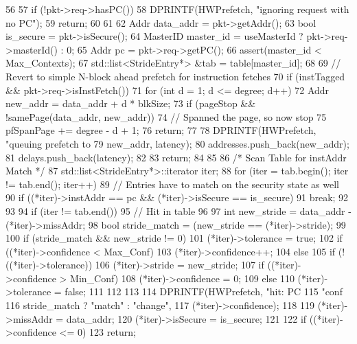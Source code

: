 \begin{DoxyCode}
56 {
57     if (!pkt->req->hasPC()) {
58         DPRINTF(HWPrefetch, "ignoring request with no PC");
59         return;
60     }
61 
62     Addr data_addr = pkt->getAddr();
63     bool is_secure = pkt->isSecure();
64     MasterID master_id = useMasterId ? pkt->req->masterId() : 0;
65     Addr pc = pkt->req->getPC();
66     assert(master_id < Max_Contexts);
67     std::list<StrideEntry*> &tab = table[master_id];
68 
69     // Revert to simple N-block ahead prefetch for instruction fetches
70     if (instTagged && pkt->req->isInstFetch()) {
71         for (int d = 1; d <= degree; d++) {
72             Addr new_addr = data_addr + d * blkSize;
73             if (pageStop && !samePage(data_addr, new_addr)) {
74                 // Spanned the page, so now stop
75                 pfSpanPage += degree - d + 1;
76                 return;
77             }
78             DPRINTF(HWPrefetch, "queuing prefetch to %
79                     new_addr, latency);
80             addresses.push_back(new_addr);
81             delays.push_back(latency);
82         }
83         return;
84     }
85 
86     /* Scan Table for instAddr Match */
87     std::list<StrideEntry*>::iterator iter;
88     for (iter = tab.begin(); iter != tab.end(); iter++) {
89         // Entries have to match on the security state as well
90         if ((*iter)->instAddr == pc && (*iter)->isSecure == is_secure)
91             break;
92     }
93 
94     if (iter != tab.end()) {
95         // Hit in table
96 
97         int new_stride = data_addr - (*iter)->missAddr;
98         bool stride_match = (new_stride == (*iter)->stride);
99 
100         if (stride_match && new_stride != 0) {
101             (*iter)->tolerance = true;
102             if ((*iter)->confidence < Max_Conf)
103                 (*iter)->confidence++;
104         } else {
105             if (!((*iter)->tolerance)) {
106                 (*iter)->stride = new_stride;
107                 if ((*iter)->confidence > Min_Conf)
108                     (*iter)->confidence = 0;
109             } else {
110                 (*iter)->tolerance = false;
111             }
112         }
113 
114         DPRINTF(HWPrefetch, "hit: PC %
115                 "conf %
116                 stride_match ? "match" : "change",
117                 (*iter)->confidence);
118 
119         (*iter)->missAddr = data_addr;
120         (*iter)->isSecure = is_secure;
121 
122         if ((*iter)->confidence <= 0)
123             return;
}}
\end{DoxyCode}
